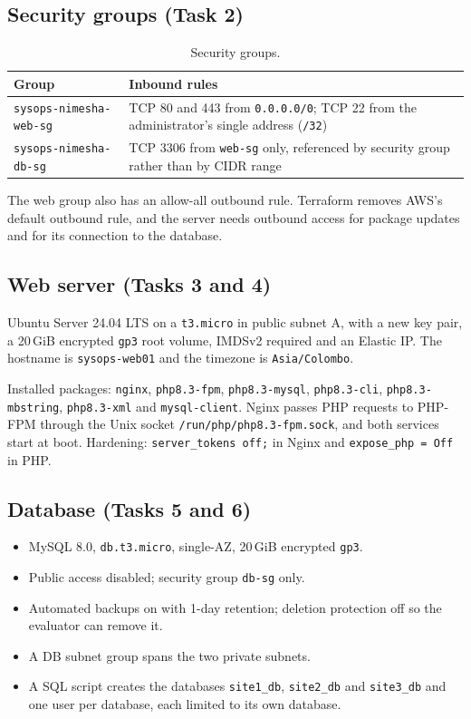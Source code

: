 \documentclass[11pt,a4paper]{article}
\newcommand{\code}[1]{\texttt{#1}}
\begin{document}
\subsection{Security groups (Task 2)}
\begin{table}[H]
\centering
\begin{tabular}{@{}p{4.6cm}p{10cm}@{}}
\toprule
\textbf{Group} & \textbf{Inbound rules}\\
\midrule
\code{sysops-nimesha-web-sg} & TCP 80 and 443 from \code{0.0.0.0/0}; TCP 22 from the administrator's single address (\code{/32})\\
\code{sysops-nimesha-db-sg} & TCP 3306 from \code{web-sg} only, referenced by security group rather than by CIDR range\\
\bottomrule
\end{tabular}
\caption{Security groups.}
\end{table}
The web group also has an allow-all outbound rule. Terraform removes AWS's default
outbound rule, and the server needs outbound access for package updates and for its
connection to the database.

\subsection{Web server (Tasks 3 and 4)}
Ubuntu Server 24.04 LTS on a \code{t3.micro} in public subnet A, with a new key pair, a
20\,GiB encrypted \code{gp3} root volume, IMDSv2 required and an Elastic IP. The hostname is
\code{sysops-web01} and the timezone is \code{Asia/Colombo}.

Installed packages: \code{nginx}, \code{php8.3-fpm}, \code{php8.3-mysql}, \code{php8.3-cli},
\code{php8.3-mbstring}, \code{php8.3-xml} and \code{mysql-client}. Nginx passes PHP requests
to PHP-FPM through the Unix socket \code{/run/php/php8.3-fpm.sock}, and both services start
at boot. Hardening: \code{server\_tokens off;} in Nginx and \code{expose\_php = Off} in PHP.

\subsection{Database (Tasks 5 and 6)}
\begin{itemize}
  \item MySQL 8.0, \code{db.t3.micro}, single-AZ, 20\,GiB encrypted \code{gp3}.
  \item Public access disabled; security group \code{db-sg} only.
  \item Automated backups on with 1-day retention; deletion protection off so the
        evaluator can remove it.
  \item A DB subnet group spans the two private subnets.
  \item A SQL script creates the databases \code{site1\_db}, \code{site2\_db} and
        \code{site3\_db} and one user per database, each limited to its own database.
\end{itemize}
\end{document}
